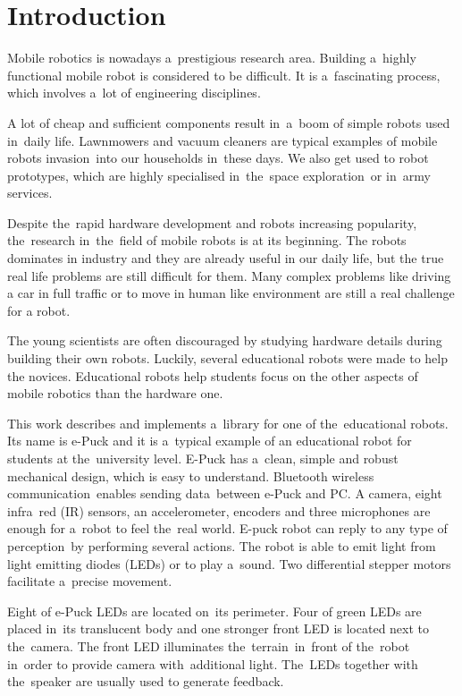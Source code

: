 \chapter{Introduction}
\label{chap:intro}
  Mobile robotics is nowadays a~prestigious research area. Building a~highly functional 
  mobile robot is considered to be difficult. 
  It is a~fascinating process, which
  involves a~lot of engineering disciplines.
  
  A lot of cheap and sufficient components result in~a~boom of simple robots used in~daily life. 
  Lawnmowers and vacuum cleaners are typical examples of mobile robots invasion~into our households in~these days.
  We also get used to robot prototypes, which are highly specialised in~the~space exploration~or in~army services.

  Despite the~rapid hardware development and robots increasing popularity,
  the~research in~the~field of mobile robots is at its beginning.
  The robots dominates in industry and they are already useful in our daily
  life, but the true real life problems are still difficult for them.
  Many complex problems like driving a car in full traffic or to move in human
  like environment are still a real challenge for a robot.
   
  The young scientists are often discouraged by
  studying hardware details during building their own robots.
  Luckily, several educational robots were made to help the novices.
  Educational robots help students focus on the other aspects of mobile robotics than the hardware one.
 
  This work describes and implements a~library for one of the~educational robots.
  Its name is e-Puck and it is a~typical example of an educational robot for students at the~university level. 
  E-Puck has a~clean, simple and robust mechanical design, which is easy to understand.
  Bluetooth wireless communication~enables sending data~between e-Puck and PC.
  A camera, eight infra~red (IR) sensors,	an accelerometer, encoders and three microphones 
  are enough for a~robot to feel the~real world.
  E-puck robot can reply to any type of perception~by performing several actions. 
  The robot is able to emit light from light emitting diodes (LEDs) or to play a~sound.
  Two differential stepper motors facilitate a~precise movement. 
  
  Eight of e-Puck LEDs are located on~its perimeter. 
  Four of green LEDs are placed in~its translucent body and
  one stronger front LED is located next to the~camera. 
  The front LED illuminates the~terrain~in~front of the~robot in~order to
  provide camera with~additional light. 
  The~LEDs together with the~speaker are usually used to
  generate feedback. 
  
